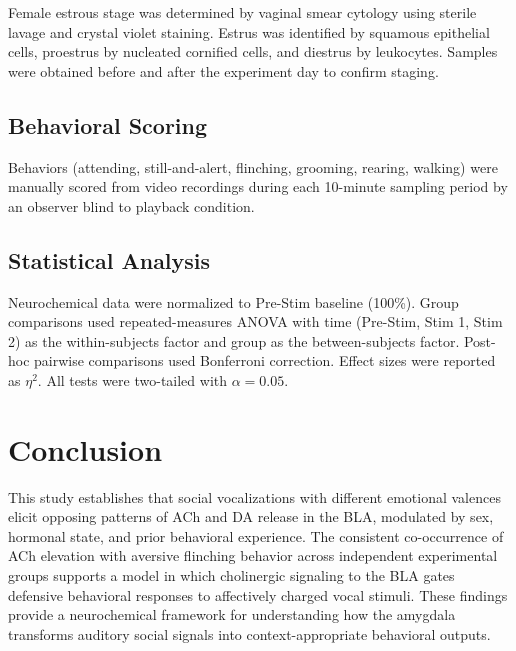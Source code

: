 \documentclass[11pt]{article}
\begin{document}
Female estrous stage was determined by vaginal smear cytology using sterile lavage and crystal violet staining. Estrus was identified by squamous epithelial cells, proestrus by nucleated cornified cells, and diestrus by leukocytes. Samples were obtained before and after the experiment day to confirm staging.

\subsection{Behavioral Scoring}

Behaviors (attending, still-and-alert, flinching, grooming, rearing, walking) were manually scored from video recordings during each 10-minute sampling period by an observer blind to playback condition.

\subsection{Statistical Analysis}

Neurochemical data were normalized to Pre-Stim baseline (100\%). Group comparisons used repeated-measures ANOVA with time (Pre-Stim, Stim 1, Stim 2) as the within-subjects factor and group as the between-subjects factor. Post-hoc pairwise comparisons used Bonferroni correction. Effect sizes were reported as $\eta^2$. All tests were two-tailed with $\alpha = 0.05$.

\section{Conclusion}

This study establishes that social vocalizations with different emotional valences elicit opposing patterns of ACh and DA release in the BLA, modulated by sex, hormonal state, and prior behavioral experience. The consistent co-occurrence of ACh elevation with aversive flinching behavior across independent experimental groups supports a model in which cholinergic signaling to the BLA gates defensive behavioral responses to affectively charged vocal stimuli. These findings provide a neurochemical framework for understanding how the amygdala transforms auditory social signals into context-appropriate behavioral outputs.



\end{document}
